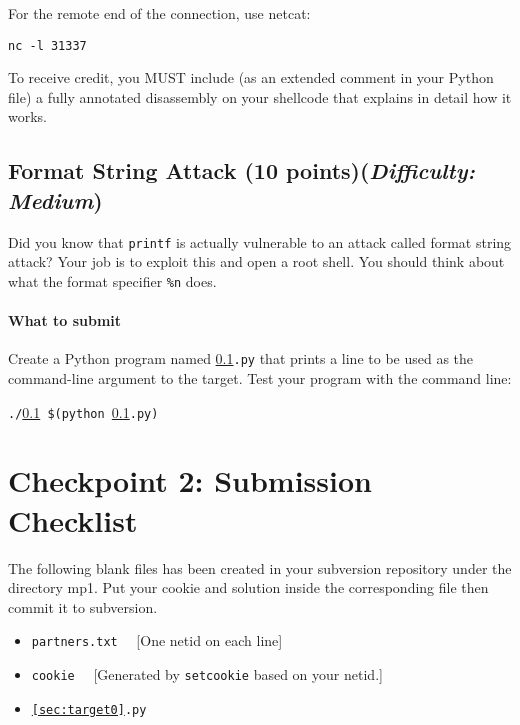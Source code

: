 \documentclass[letterpaper,12pt]{report}
\begin{document}
{\medskip

For the remote end of the connection, use netcat:

\smallskip

\quad\texttt{nc -l 31337}

\medskip

To receive credit, you MUST include (as an extended comment in your Python file) a fully annotated disassembly on your shellcode that explains in detail how it works.

\subsection{Format String Attack (10 points)\hfill\rm\normalsize (\emph{Difficulty: Medium})}
\label{sec:target10}

Did you know that \texttt{printf} is actually vulnerable to an attack called format string attack? Your job is to exploit this and open a root shell. You should think about what the format specifier \texttt{\%n} does.

\paragraph{What to submit}
Create a Python program named \texttt{\ref{sec:target10}.py} that prints a line to be used as the command-line argument to the target.  Test your program with the command line:

\smallskip

\quad\texttt{./\ref{sec:target10} \$(python \ref{sec:target10}.py)}


\section*{Checkpoint 2: Submission Checklist}

The following blank files has been created in your subversion repository under the directory mp1.  Put your cookie and solution inside the corresponding file then commit it to subversion.

\medskip

\begin{itemize}

\item \texttt{partners.txt} \ \ [One netid on each line]

\item \texttt{cookie} \ \ [Generated by \texttt{setcookie} based on your netid.]

\item \texttt{\ref{sec:target0}.py}


\end{itemize}}
\end{document}
